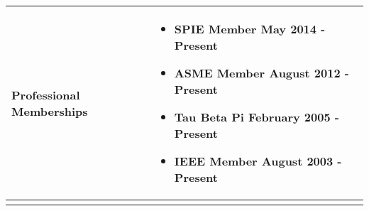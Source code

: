 \begin{tabular}{L{\hlcolw}  L{\rcolw}}
\textbf{\Large Professional Memberships} & 
\vspace{-0.3in} 
\begin{itemize}[leftmargin = \itemmargin]
\item \textbf{SPIE Member} \hfill May 2014 - Present
\vspace{-0.1in} 
\item \textbf{ASME Member} \hfill August 2012 - Present
\vspace{-0.1in} 
\item \textbf{Tau Beta Pi} \hfill February 2005 - Present
\vspace{-0.1in} 
\item \textbf{IEEE Member} \hfill August 2003 - Present
\end{itemize} \\
\hline \\
\end{tabular}